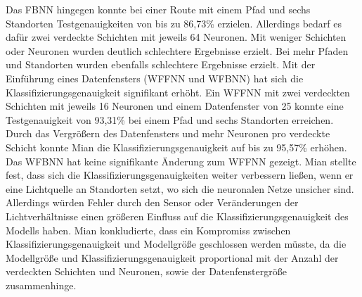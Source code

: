 \newline
\newline
Das FBNN hingegen konnte bei einer Route mit einem Pfad und sechs Standorten Testgenauigkeiten von bis zu 86,73\% erzielen.
Allerdings bedarf es dafür zwei verdeckte Schichten mit jeweils 64 Neuronen.
Mit weniger Schichten oder Neuronen wurden deutlich schlechtere Ergebnisse erzielt.
Bei mehr Pfaden und Standorten wurden ebenfalls schlechtere Ergebnisse erzielt.
\newline
\newline
Mit der Einführung eines Datenfensters (WFFNN und WFBNN) hat sich die Klassifizierungsgenauigkeit signifikant erhöht.
Ein WFFNN mit zwei verdeckten Schichten mit jeweils 16 Neuronen und einem Datenfenster von 25 konnte eine Testgenauigkeit von 93,31\%
bei einem Pfad und sechs Standorten erreichen.
Durch das Vergrößern des Datenfensters und mehr Neuronen pro verdeckte Schicht konnte Mian die Klassifizierungsgenauigkeit auf bis zu 95,57\% erhöhen.
Das WFBNN hat keine signifikante Änderung zum WFFNN gezeigt.
\newline
\newline
Mian stellte fest, dass sich die Klassifizierungsgenauigkeiten weiter verbessern ließen,
wenn er eine Lichtquelle an Standorten setzt, wo sich die neuronalen Netze unsicher sind.
Allerdings würden Fehler durch den Sensor oder Veränderungen der Lichtverhältnisse
einen größeren Einfluss auf die Klassifizierungsgenauigkeit des Modells haben.
\newline
\newline
Mian konkludierte, dass ein Kompromiss zwischen Klassifizierungsgenauigkeit und Modellgröße geschlossen werden müsste,
da die Modellgröße und Klassifizierungsgenauigkeit proportional mit der Anzahl der verdeckten Schichten und Neuronen,
sowie der Datenfenstergröße zusammenhinge.
